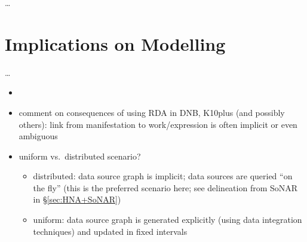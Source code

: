 \dots

\section{Implications on Modelling}
\label{sec:implications_on_modelling}

\dots


\begin{itemize}
  \item
  \item
    comment on consequences of using RDA in DNB, K10plus (and possibly others): link from manifestation to work/expression is often implicit or even ambiguous
  \item 
    uniform vs.\ distributed scenario?
    \begin{itemize}
      \item
        distributed: data source graph is implicit; data sources are queried \enquote{on the fly}
        (this is the preferred scenario here; see delineation from SoNAR in §\ref{sec:HNA+SoNAR})
      \item
        uniform: data source graph is generated explicitly (using data integration techniques)
        and updated in fixed intervals
    \end{itemize}
\end{itemize}


